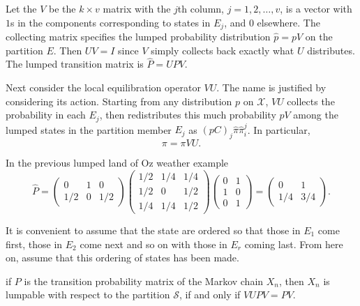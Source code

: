 \documentclass[12pt]{article}
\begin{document}
Let the  $V$ be the $k \times v$ matrix with the $j$th column,
\( j = 1, 2, \dots, v \), is a vector with $1$s in the components corresponding to
states in $E_j$, and $0$ elsewhere.  The collecting matrix specifies
the lumped probability distribution $\hat{p} = p V$ on the partition
$E$.   Then $UV = I$ since $V$ simply collects back exactly what $U$
distributes.   The lumped
transition matrix is \( \hat{P} = UPV \).

Next consider the local equilibration operator $VU$.  The name is
justified by considering its action.  Starting from any distribution
$p$ on $\mathcal{X}$, $VU$ collects the probability in each $E_j$,
then redistributes this much probability $pV$ among the lumped states
in the partition member $E_j$ as $(pC)_j \hat{\pi} \hat{\pi}_i^j$.  In
particular,
\[
  \pi = \pi VU. 
\]

\begin{example}
  In the previous lumped land of Oz weather example
  \[
    \hat{P} =
    \begin{pmatrix}
      0 & 1 & 0 \\
      1/2 & 0 & 1/2
    \end{pmatrix}
    \begin{pmatrix}
     1/2 & 1/4 & 1/4  \\
     1/2 & 0 & 1/2 \\
       1/4 & 1/4 & 1/2 
   \end{pmatrix}
   \begin{pmatrix}
     0 & 1 \\
     1 & 0 \\
     0 & 1
   \end{pmatrix} =
   \begin{pmatrix}
     0 & 1 \\
     1/4 & 3/4
   \end{pmatrix}.
   \]
\end{example}


It is convenient to assume that the state are ordered so that those
in $E_1$ come first, those in $E_{2}$ come next and so on with those
in $E_r$ coming last.  From here on, assume that this ordering of
states has been made.


\begin{theorem}
  if $P$ is the transition probability matrix of the Markov chain
$X_n$, then $X_n$ is lumpable with respect to the partition $\mathcal{S}$, if and only if
\( VUPV = PV \).
\end{theorem}
\end{document}
